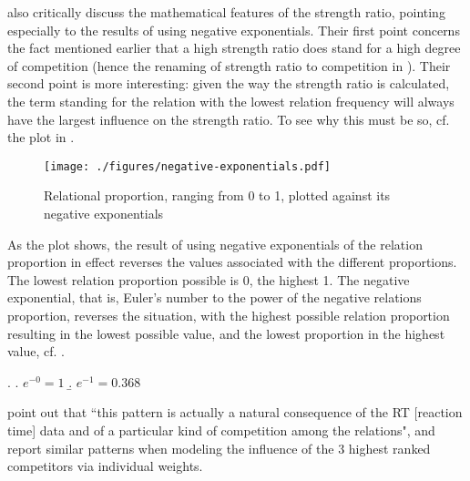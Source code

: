 \citet{Maguireetal:2007} also critically discuss the mathematical
features of the strength ratio, pointing especially to the results of
using negative exponentials. 
Their first point concerns the fact
mentioned earlier that a high strength ratio does
stand for a high degree of competition (hence the renaming of strength
ratio to competition
in \citealt[1574]{SpaldingandGagne:2008}). Their second point is more
interesting: given the way the strength ratio is calculated, the term
standing for the relation with the lowest relation frequency will always have the largest
influence on the strength ratio. To see why this must be so, cf. the
plot in .

\begin{figure}[!htb]
  \centering
\texttt{[image: ./figures/negative-exponentials.pdf]} 
  
  \caption{Relational proportion, ranging from 0 to 1, plotted against
  its negative exponentials}
\label{fig:expenonential}
\end{figure}

\enlargethispage{1\baselineskip}
As the plot shows, the result of using negative exponentials of the
relation proportion in effect reverses the values associated with the
different proportions. The lowest relation proportion possible is 0,
the highest 1. The negative exponential, that is, Euler's number to
the power of the negative relations proportion, reverses the situation,
with the highest possible relation proportion resulting in the lowest
possible value, and the lowest proportion in the highest value,
cf. \Next.

\ex. \a.  $e^{-0} = 1$
\b. $e^{-1} = 0.368$

\citet[1574]{SpaldingandGagne:2008} point out that ``this pattern is actually
a natural consequence of the RT [reaction time] data and of a particular kind of
competition among the relations", and report similar patterns when
modeling the influence of the 3 highest ranked competitors via
individual weights. 

